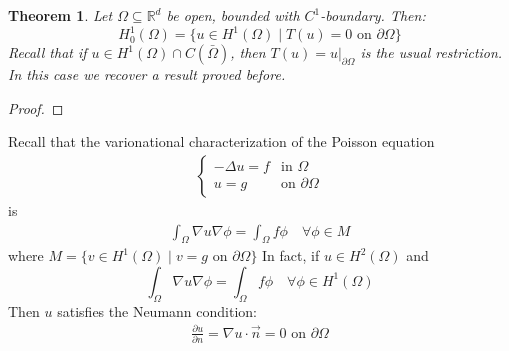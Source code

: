 \documentclass{report}
\theoremstyle{tommy}
\newtheorem{thm}[defn]{Theorem}
\begin{document}
  \begin{thm}
    Let \(\Omega \subseteq \mathbb{R}^d\) be open, bounded with \(C^1\)-boundary. Then:
    \[H_0^1(\Omega) = \{u \in H^1(\Omega) \mid T(u) = 0 \text{ on } \partial \Omega\}\]
    Recall that if \(u \in H^1(\Omega) \cap C(\bar \Omega)\), then \(T(u) = u|_{\partial \Omega}\) is the usual restriction. In this case we recover a result proved before.
  \end{thm}

  \begin{proof}
  \end{proof}

  Recall that the varionational characterization of the Poisson equation 
  \begin{align*}
    \begin{cases}
      - \Delta u = f &\text{in } \Omega \\ u = g &\text{on } \partial \Omega
    \end{cases}
  \end{align*}
  is 
  \begin{align*}
    \int_\Omega \nabla u \nabla \phi = \int_\Omega f \phi \quad \forall \phi \in M
  \end{align*}
  where \(M = \{v \in H^1(\Omega) \mid v = g \text{ on } \partial \Omega\}\)
  In fact, if \(u \in H^2(\Omega)\) and 
  \[\int_\Omega \nabla u \nabla \phi = \int_\Omega f \phi \quad \forall \phi \in H^1(\Omega)\]
  Then \(u\) satisfies the Neumann condition:
  \begin{align*}
    \frac{\partial u}{\partial n} = \nabla u \cdot \vec{n} = 0 \text{ on } \partial \Omega
  \end{align*}
\end{document}
